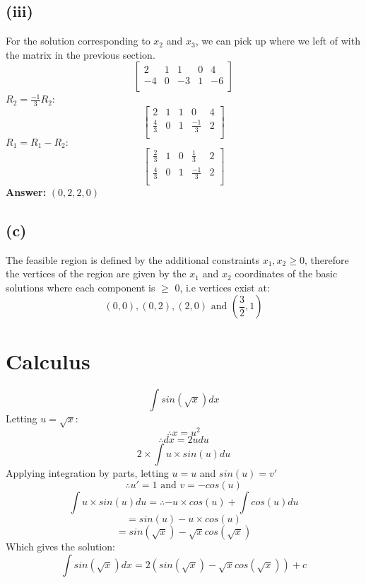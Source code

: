 \documentclass[11pt]{article}
\begin{document}
\subsection*{(iii)}
For the solution corresponding to $x_2$ and $x_3$, we can pick up where we left of with the matrix in the previous section.
$$\begin{bmatrix}
2 & 1 & 1 & 0 & 4\\
-4 & 0 & -3 & 1 & -6\\
\end{bmatrix}$$
$R_2=\frac{-1}{3}R_2$:
$$\begin{bmatrix}
2 & 1 & 1 & 0 & 4\\
\frac{4}{3} & 0 & 1 & \frac{-1}{3} & 2\\
\end{bmatrix}$$
$R_1=R_1-R_2:$
$$\begin{bmatrix}
\frac{2}{3} & 1 & 0 & \frac{1}{3} & 2\\
\frac{4}{3} & 0 & 1 & \frac{-1}{3} & 2\\
\end{bmatrix}$$
\textbf{Answer:} $(0,2,2,0)$
\subsection*{(c)}
The feasible region is defined by the additional constraints $x_1,x_2 \geq 0$, therefore the vertices of the region are given by the $x_1$ and $x_2$ coordinates of the basic solutions where each component is $\geq$ 0, i.e vertices exist at:
$$(0,0),(0,2),(2,0)\text{ and }(\frac{3}{2}, 1)$$
\section*{Calculus}
$$\int sin(\sqrt{x}) dx $$
Letting $u=\sqrt{x}$:
$$\therefore x = u^2$$
$$\therefore dx = 2udu$$
$$2 \times \int u\times sin(u) du $$
Applying integration by parts, letting $u=u$ and $sin(u)=v'$
$$\therefore u'=1 \text{ and } v=-cos(u)$$
$$\int u\times sin(u) du =\therefore -u\times cos(u)+\int cos(u)du$$
$$ = sin(u)-u\times cos(u)$$
$$ = sin(\sqrt{x})- \sqrt{x}cos(\sqrt{x})$$
Which gives the solution:
$$\int sin(\sqrt{x}) dx =2( sin(\sqrt{x})- \sqrt{x}cos(\sqrt{x}))+c$$
\end{document}

